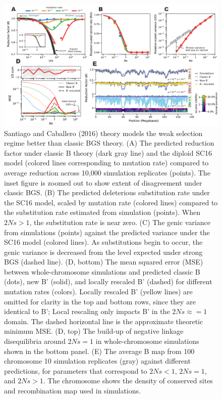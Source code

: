 \documentclass[11pt]{article}
\begin{document}
\begin{figure}[htbp] \centering
    \includegraphics[width=\textwidth]{figures/figure_1.pdf} \caption{Santiago and Caballero (2016) theory models the weak selection regime better than classic BGS theory. (A) The predicted reduction factor
        under classic B theory (dark gray line) and the diploid SC16 model
        (colored lines corresponding to mutation rate) compared to average
        reduction across 10,000 simulation replicates (points). The inset figure is zoomed out to show extent of disagreement under classic BGS. (B) The predicted
        deleterious substitution rate under the SC16 model, scaled by mutation rate (colored
        lines) compared to the substitution rate estimated from simulation (points). When
        $2Ns>1$, the substitution rate is near zero. (C) The genic variance from
        simulations (points) against the predicted variance under the SC16
        model (colored lines). As substitutions begin to occur, the genic
        variance is decreased from the level expected under strong BGS (dashed
        line). (D, bottom) The mean squared error (MSE) between
        whole-chromosome simulations and predicted classic B (dots), new B'
        (solid), and locally rescaled B' (dashed) for different mutation rates
        (colors). Locally rescaled B' (yellow lines) are omitted for clarity in the top and bottom 
        rows, since they are identical to B'; Local rescaling only impacts B'
        in the $2Ns \approx = 1$ domain. The dashed horizontal line is the approximate theoretic
        minimum MSE. (D, top) The build-up of negative linkage disequilibria
        around $2Ns=1$ in whole-chromosome simulations shown in the bottom panel. (E) The
        average B map from 100 chromosome 10 simulation replicates (gray)
    against different predictions, for parameters that correspond to $2Ns < 1$,
$2Ns = 1$, and $2Ns > 1$. The chromosome shows the density of conserved sites
and recombination map used in simulations. }
  \label{fig:figure-1}
\end{figure}
\end{document}
